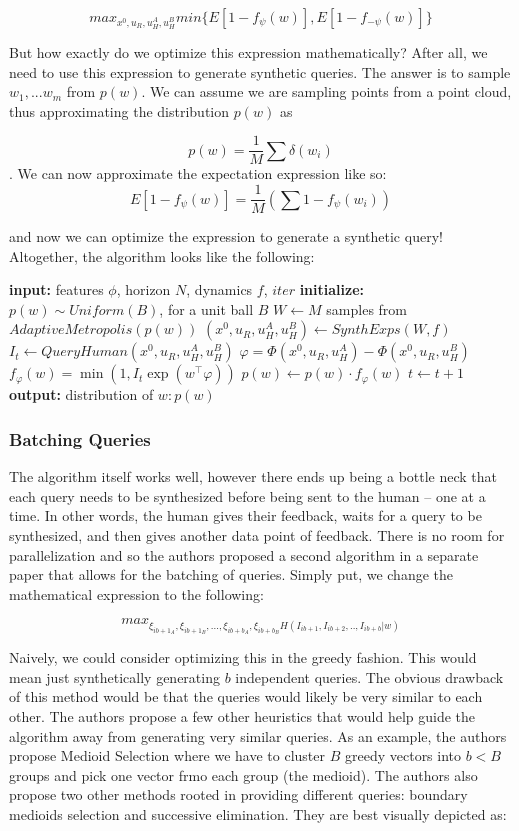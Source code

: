 \documentclass[
  letterpaper,
  DIV=11,
  numbers=noendperiod,
  oneside]{scrreprt}
\theoremstyle{remark}
\begin{document}
\[max_{x^0, u_R, u_H^A, u_H^B} min\{E[1-f_{\psi}(w)], E[1 - f_{-\psi}(w)]\}\]

But how exactly do we optimize this expression mathematically? After
all, we need to use this expression to generate synthetic queries. The
answer is to sample \(w_1, ... w_m\) from \(p(w)\). We can assume we are
sampling points from a point cloud, thus approximating the distribution
\(p(w)\) as

\[p(w) = \frac{1}{M} \sum \delta (w_i)\]. We can now approximate the
expectation expression like so:
\[E[1 - f_{\psi}(w)] = \frac{1}{M} (\sum 1 - f_{\psi}(w_i))\]

and now we can optimize the expression to generate a synthetic query!
Altogether, the algorithm looks like the following:

\textbf{input:} features \(\phi\), horizon \(N\), dynamics \(f\),
\(iter\) \textbf{initialize:} \(p(w) \sim Uniform(B)\), for a unit ball
\(B\) \(W \gets M\) samples from \(AdaptiveMetropolis(p(w))\)
\((x^0, u_R, u^A_H, u^B_H) \gets SynthExps(W,f)\)
\(I_t \gets QueryHuman(x^0, u_R, u^A_H, u^B_H)\)
\(\varphi = \Phi(x^0, u_R, u^A_H) - \Phi(x^0, u_R, u^B_H)\)
\(f_\varphi(w) = \min(1, I_t\exp(w^\top \varphi))\)
\(p(w) \gets p(w) \cdot f_\varphi(w)\) \(t \gets t+1\) \textbf{output:}
distribution of \(w: p(w)\)

\subsubsection{Batching Queries}\label{batching-queries}

The algorithm itself works well, however there ends up being a bottle
neck that each query needs to be synthesized before being sent to the
human -- one at a time. In other words, the human gives their feedback,
waits for a query to be synthesized, and then gives another data point
of feedback. There is no room for parallelization and so the authors
proposed a second algorithm in a separate paper that allows for the
batching of queries. Simply put, we change the mathematical expression
to the following:

\[max_{\xi_{ib+1_A}, \xi_{ib+1_B}, ... , \xi_{ib+b_A}, \xi_{ib+b_B} H(I_{ib+1}, I_{ib+2}, .., I_{ib+b} | w)}\]

Naively, we could consider optimizing this in the greedy fashion. This
would mean just synthetically generating \(b\) independent queries. The
obvious drawback of this method would be that the queries would likely
be very similar to each other. The authors propose a few other
heuristics that would help guide the algorithm away from generating very
similar queries. As an example, the authors propose Medioid Selection
where we have to cluster \(B\) greedy vectors into \(b < B\) groups and
pick one vector frmo each group (the medioid). The authors also propose
two other methods rooted in providing different queries: boundary
medioids selection and successive elimination. They are best visually
depicted as:
\end{document}
